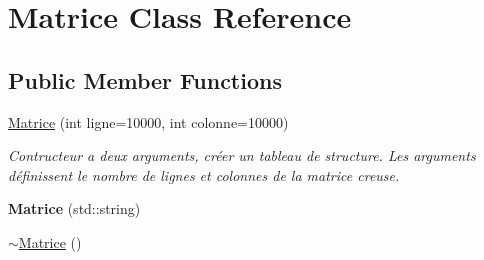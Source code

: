 \hypertarget{classMatrice}{\section{Matrice Class Reference}
\label{classMatrice}
}
\subsection*{Public Member Functions}
\begin{DoxyCompactItemize}
\item 
\hyperlink{classMatrice_a381368ea1a5753a9864c31a1e1596a2e}{Matrice} (int ligne=10000, int colonne=10000)
\begin{DoxyCompactList}\small\item\em Contructeur a deux arguments, créer un tableau de structure. Les arguments définissent le nombre de lignes et colonnes de la matrice creuse. \end{DoxyCompactList}\item 
\hypertarget{classMatrice_a7a9d99db5f24a3b2c9b662d68b17e18c}{{\bfseries Matrice} (std\-::string)}\label{classMatrice_a7a9d99db5f24a3b2c9b662d68b17e18c}

\item 
\hypertarget{classMatrice_ae9076e71ad3223654b0d51225bc8b3c0}{\hyperlink{classMatrice_ae9076e71ad3223654b0d51225bc8b3c0}{$\sim$\-Matrice} ()}\label{classMatrice_ae9076e71ad3223654b0d51225bc8b3c0}


\end{DoxyCompactItemize}
